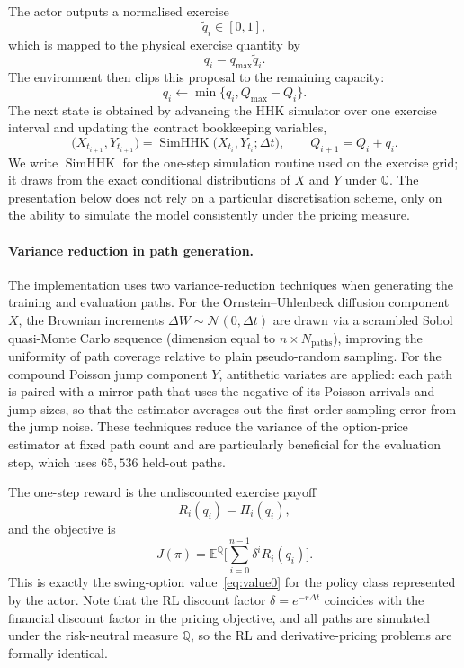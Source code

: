 \documentclass[a4paper,fleqn]{cas-dc}
\begin{document}
The actor outputs a normalised exercise
\[
\tilde{q}_i \in [0,1],
\]
which is mapped to the physical exercise quantity by
\[
q_i = q_{\max} \tilde{q}_i.
\]
The environment then clips this proposal to the remaining capacity:
\[
q_i \leftarrow \min\{q_i, Q_{\max} - Q_i\}.
\]
The next state is obtained by advancing the HHK simulator over one exercise interval and updating the contract bookkeeping variables,
\[
\bigl(X_{t_{i+1}},Y_{t_{i+1}}\bigr)
=
\operatorname{SimHHK}\bigl(X_{t_i},Y_{t_i};\Delta t\bigr),
\qquad
Q_{i+1} = Q_i + q_i.
\]
We write $\operatorname{SimHHK}$ for the one-step simulation routine used on the exercise grid; it draws from the exact conditional distributions of $X$ and $Y$ under $\mathbb{Q}$. The presentation below does not rely on a particular discretisation scheme, only on the ability to simulate the model consistently under the pricing measure.

\paragraph{Variance reduction in path generation.}
The implementation uses two variance-reduction techniques when generating the training and evaluation paths.
For the Ornstein--Uhlenbeck diffusion component $X$, the Brownian increments $\Delta W \sim \mathcal{N}(0,\Delta t)$ are drawn via a scrambled Sobol quasi-Monte Carlo sequence (dimension equal to $n \times N_{\mathrm{paths}}$), improving the uniformity of path coverage relative to plain pseudo-random sampling.
For the compound Poisson jump component $Y$, antithetic variates are applied: each path is paired with a mirror path that uses the negative of its Poisson arrivals and jump sizes, so that the estimator averages out the first-order sampling error from the jump noise.
These techniques reduce the variance of the option-price estimator at fixed path count and are particularly beneficial for the evaluation step, which uses $65{,}536$ held-out paths.

The one-step reward is the undiscounted exercise payoff
\[
R_i(q_i) = \Pi_i(q_i),
\]
and the objective is
\[
J(\pi) =
\mathbb{E}^{\mathbb{Q}}
\biggl[
\sum_{i=0}^{n-1} \delta^i R_i(q_i)
\biggr].
\]
This is exactly the swing-option value~\eqref{eq:value0} for the policy class represented by the actor. Note that the RL discount factor $\delta = e^{-r\Delta t}$ coincides with the financial discount factor in the pricing objective, and all paths are simulated under the risk-neutral measure $\mathbb{Q}$, so the RL and derivative-pricing problems are formally identical.
\end{document}
